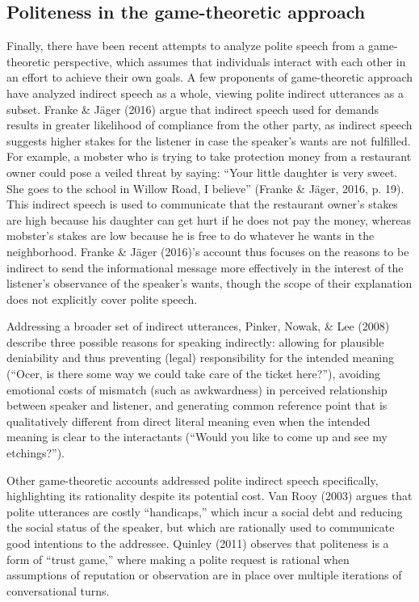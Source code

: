 \documentclass[oneside]{report}
\begin{document}
\subsection{Politeness in the game-theoretic
approach}\label{politeness-in-the-game-theoretic-approach}

Finally, there have been recent attempts to analyze polite speech from a
game-theoretic perspective, which assumes that individuals interact with
each other in an effort to achieve their own goals. A few proponents of
game-theoretic approach have analyzed indirect speech as a whole,
viewing polite indirect utterances as a subset. Franke \& Jäger (2016)
argue that indirect speech used for demands results in greater
likelihood of compliance from the other party, as indirect speech
suggests higher stakes for the listener in case the speaker's wants are
not fulfilled. For example, a mobster who is trying to take protection
money from a restaurant owner could pose a veiled threat by saying:
``Your little daughter is very sweet. She goes to the school in Willow
Road, I believe'' (Franke \& Jäger, 2016, p. 19). This indirect speech
is used to communicate that the restaurant owner's stakes are high
because his daughter can get hurt if he does not pay the money, whereas
mobster's stakes are low because he is free to do whatever he wants in
the neighborhood. Franke \& Jäger (2016)'s account thus focuses on the
reasons to be indirect to send the informational message more
effectively in the interest of the listener's observance of the
speaker's wants, though the scope of their explanation does not
explicitly cover polite speech.

Addressing a broader set of indirect utterances, Pinker, Nowak, \& Lee
(2008) describe three possible reasons for speaking indirectly: allowing
for plausible deniability and thus preventing (legal) responsibility for
the intended meaning (``Ocer, is there some way we could take care of
the ticket here?''), avoiding emotional costs of mismatch (such as
awkwardness) in perceived relationship between speaker and listener, and
generating common reference point that is qualitatively different from
direct literal meaning even when the intended meaning is clear to the
interactants (``Would you like to come up and see my etchings?'').

Other game-theoretic accounts addressed polite indirect speech
specifically, highlighting its rationality despite its potential cost.
Van Rooy (2003) argues that polite utterances are costly ``handicaps,''
which incur a social debt and reducing the social status of the speaker,
but which are rationally used to communicate good intentions to the
addressee. Quinley (2011) observes that politeness is a form of ``trust
game,'' where making a polite request is rational when assumptions of
reputation or observation are in place over multiple iterations of
conversational turns.
\end{document}
